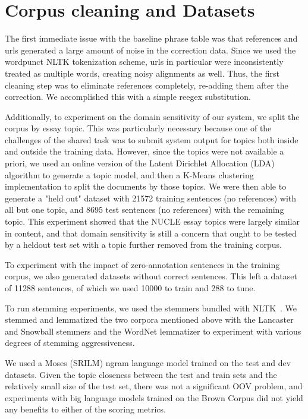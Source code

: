 \documentclass[11pt,letterpaper]{article}
\begin{document}
\section{Corpus cleaning and Datasets}

The first immediate issue with the baseline phrase table was that references and urls generated a large amount of noise in the correction data. Since we used the wordpunct NLTK tokenization scheme, urls in particular were inconsistently treated as multiple words, creating noisy alignments as well. Thus, the first cleaning step was to eliminate references completely, re-adding them after the correction. We accomplished this with a simple reegex substitution. 

Additionally, to experiment on the domain sensitivity of our system, we split the corpus by essay topic. This was particularly necessary because one of the challenges of the shared task was to submit system output for topics both inside and outside the training data. However, since the topics were not available a priori, we used an online version of the Latent Dirichlet Allocation (LDA) algorithm to generate a topic model, and then a K-Means clustering implementation to split the documents by those topics. We were then able to generate a "held out" dataset with 21572 training sentences (no references) with all but one topic, and 8695 test sentences (no references) with the remaining topic. This experiment showed that the NUCLE essay topics were largely similar in content, and that domain sensitivity is still a concern that ought to be tested by a heldout test set with a topic further removed from the training corpus.

To experiment with the impact of zero-annotation sentences in the training corpus, we also generated datasets without correct sentences. This left a dataset of 11288 sentences, of which we used 10000 to train and 288 to tune. 

To run stemming experiments, we used the stemmers bundled with NLTK~\cite{nltk}. We stemmed and lemmatized the two corpora mentioned above with the Lancaster and Snowball stemmers and the WordNet lemmatizer to experiment with various degrees of stemming aggressiveness.

We used a Moses (SRILM) ngram language model trained on the test and dev datasets. Given the topic closeness between the test and train sets and the relatively small size of the test set, there was not a significant OOV problem, and experiments with big language models trained on the Brown Corpus did not yield any benefits to either of the scoring metrics.
\end{document}
